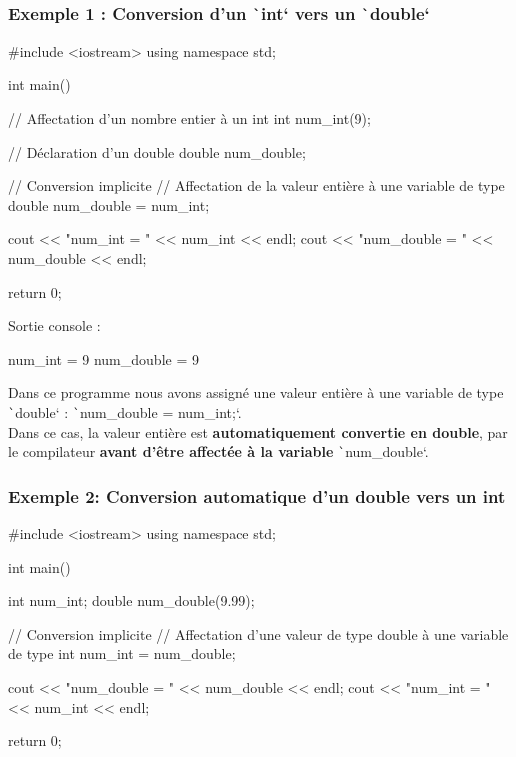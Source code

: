 \documentclass[10pt]{article}
\begin{document}
\subsubsection{Exemple 1 : Conversion d'un \texttt`int` vers un \texttt`double`}
\begin{cppcode}
    #include <iostream>
    using namespace std;

    int main() {
        // Affectation d'un nombre entier à un int
        int num_int(9);

        // Déclaration d'un double
        double num_double;

        // Conversion implicite
        // Affectation de la valeur entière à une variable de type double
        num_double = num_int;

        cout << "num_int = " << num_int << endl;
        cout << "num_double = " << num_double << endl;

        return 0;
    }
\end{cppcode}

\bigskip
Sortie console :

\begin{textcode}
    num_int = 9
    num_double = 9
\end{textcode}

Dans ce programme nous avons assigné une valeur entière à une variable de type \texttt`double` :
\texttt`num_double = num_int;`.\\
Dans ce cas, la valeur entière est \textbf{automatiquement convertie en double}, par le compilateur \textbf{avant d'être affectée 
à la variable} \texttt`num_double`.


\subsubsection{Exemple 2: Conversion automatique d'un double vers un int}
\begin{cppcode}
    #include <iostream>
    using namespace std;

    int main() {

    int num_int;
    double num_double(9.99);

    // Conversion implicite
    // Affectation d'une valeur de type double à une variable de type int
    num_int = num_double;

    cout << "num_double = " << num_double << endl;
    cout << "num_int = " << num_int << endl;

    return 0;
    }
\end{cppcode}
\end{document}
